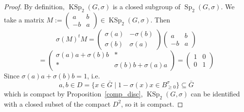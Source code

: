 \documentclass[a4paper,oneside,11pt]{amsart}
\DeclareMathOperator{\Sp}{Sp}
\DeclareMathOperator{\KSp}{KSp}
\theoremstyle{plain}
\theoremstyle{definition}
\theoremstyle{remark}
\begin{document}
\begin{proof} By definition, $\KSp_2(G,\sigma)$ is a closed subgroup of $\Sp_2(G,\sigma)$. We take a matrix $M:=\begin{pmatrix}
a & b \\
-b & a
\end{pmatrix}\in \KSp_2(G,\sigma)$.
Then
$$\sigma(M)^tM=\begin{pmatrix}
\sigma(a) & -\sigma(b) \\
\sigma(b) & \sigma(a)
\end{pmatrix}
\begin{pmatrix}
a & b \\
-b & a
\end{pmatrix}$$
$$=
\begin{pmatrix}
\sigma(a)a+\sigma(b)b & * \\
* & \sigma(b)b+\sigma(a)a
\end{pmatrix}=\begin{pmatrix}
1 & 0 \\
0 & 1
\end{pmatrix}$$
Since $\sigma(a)a+\sigma(b)b=1$, i.e.
$$a,b\in D=\{x\in \bar G\mid 1-\sigma(x)x\in B^{\sigma}_{\geq 0}\}\subseteq \bar G$$
which is compact by Proposition~\ref{comp_disc}, $\KSp_2(G,\sigma)$ can be identified with a closed subset of the compact $D^2$, so it is compact.


\end{proof}
\end{document}
